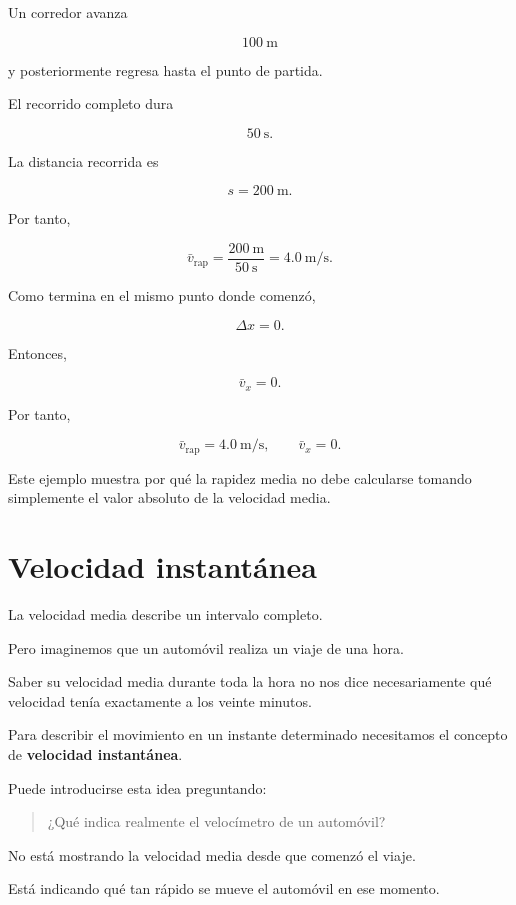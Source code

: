 \begin{ejemplo}

Un corredor avanza

\[ \SI{100}{\meter} \]

y posteriormente regresa hasta el punto de partida.

El recorrido completo dura

\[ \SI{50}{\second}. \]

La distancia recorrida es

\[
s=\SI{200}{\meter}.
\]

Por tanto,

\[
\bar{v}_{\text{rap}}
=\frac{\SI{200}{\meter}}{\SI{50}{\second}}
=\SI{4.0}{\meter\per\second}.
\]

Como termina en el mismo punto donde comenzó,

\[ \Delta x=0. \]

Entonces,

\[
\bar{v}_x=0.
\]

Por tanto,

\[
\boxed{\bar{v}_{\text{rap}}
=\SI{4.0}{\meter\per\second}},
\qquad
\boxed{\bar{v}_x=0}.
\]

Este ejemplo muestra por qué la rapidez media no debe calcularse tomando
simplemente el valor absoluto de la velocidad media.
\end{ejemplo}


\section{Velocidad instantánea}

La velocidad media describe un intervalo completo.

Pero imaginemos que un automóvil realiza un viaje de una hora.

Saber su velocidad media durante toda la hora no nos dice necesariamente qué
velocidad tenía exactamente a los veinte minutos.

Para describir el movimiento en un instante determinado necesitamos el
concepto de \textbf{velocidad instantánea}.

\begin{notapedagogica}
Puede introducirse esta idea preguntando:

\begin{quote}
¿Qué indica realmente el velocímetro de un automóvil?
\end{quote}

No está mostrando la velocidad media desde que comenzó el viaje.

Está indicando qué tan rápido se mueve el automóvil en ese momento.
\end{notapedagogica}


